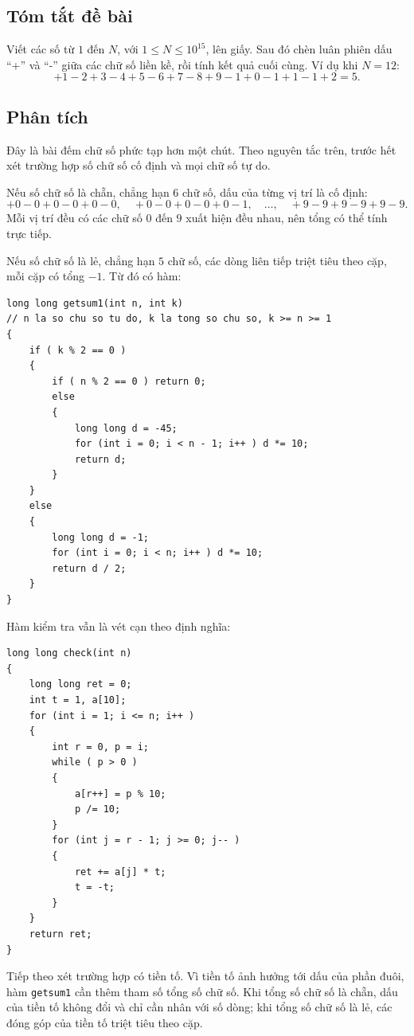 \documentclass[11pt]{article}
\begin{document}
\subsection*{Tóm tắt đề bài}

Viết các số từ \(1\) đến \(N\), với \(1\le N\le 10^{15}\), lên giấy. Sau đó
chèn luân phiên dấu ``+'' và ``-'' giữa các chữ số liền kề, rồi tính kết quả
cuối cùng. Ví dụ khi \(N=12\):
\[
  +1-2+3-4+5-6+7-8+9-1+0-1+1-1+2=5.
\]

\subsection*{Phân tích}

Đây là bài đếm chữ số phức tạp hơn một chút. Theo nguyên tắc trên, trước hết
xét trường hợp số chữ số cố định và mọi chữ số tự do.

Nếu số chữ số là chẵn, chẳng hạn \(6\) chữ số, dấu của từng vị trí là cố định:
\[
  +0-0+0-0+0-0,\quad
  +0-0+0-0+0-1,\quad \ldots,\quad
  +9-9+9-9+9-9.
\]
Mỗi vị trí đều có các chữ số \(0\) đến \(9\) xuất hiện đều nhau, nên tổng có
thể tính trực tiếp.

Nếu số chữ số là lẻ, chẳng hạn \(5\) chữ số, các dòng liên tiếp triệt tiêu theo
cặp, mỗi cặp có tổng \(-1\). Từ đó có hàm:

\begin{verbatim}
long long getsum1(int n, int k)
// n la so chu so tu do, k la tong so chu so, k >= n >= 1
{
    if ( k % 2 == 0 )
    {
        if ( n % 2 == 0 ) return 0;
        else
        {
            long long d = -45;
            for (int i = 0; i < n - 1; i++ ) d *= 10;
            return d;
        }
    }
    else
    {
        long long d = -1;
        for (int i = 0; i < n; i++ ) d *= 10;
        return d / 2;
    }
}
\end{verbatim}

Hàm kiểm tra vẫn là vét cạn theo định nghĩa:

\begin{verbatim}
long long check(int n)
{
    long long ret = 0;
    int t = 1, a[10];
    for (int i = 1; i <= n; i++ )
    {
        int r = 0, p = i;
        while ( p > 0 )
        {
            a[r++] = p % 10;
            p /= 10;
        }
        for (int j = r - 1; j >= 0; j-- )
        {
            ret += a[j] * t;
            t = -t;
        }
    }
    return ret;
}
\end{verbatim}

Tiếp theo xét trường hợp có tiền tố. Vì tiền tố ảnh hưởng tới dấu của phần
đuôi, hàm \texttt{getsum1} cần thêm tham số tổng số chữ số. Khi tổng số chữ số
là chẵn, dấu của tiền tố không đổi và chỉ cần nhân với số dòng; khi tổng số
chữ số là lẻ, các đóng góp của tiền tố triệt tiêu theo cặp.
\end{document}
